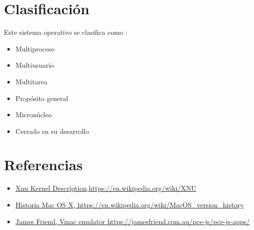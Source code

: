 \documentclass[paper=a4, fontsize=12pt]{article} 		%
\numberwithin{equation}{section}						%
\numberwithin{table}{section} 							%
\begin{document}
\section{Clasificación}
Este sistema operativo se clasifica como : 
\begin{itemize}
\item Multiproceso 
\item Multiusuario
\item Multitarea
\item Propósito general
\item Micronúcleo
\item Cerrado  en su  desarrollo
\end{itemize}
\section{Referencias}
\begin{itemize}
\item  \hyperref[https://en.wikipedia.org/wiki/XNU]{Xnu Kernel Description,https://en.wikipedia.org/wiki/XNU}
\item \hyperref[https://en.wikipedia.org/wiki/MacOS_version_history]{Historia Mac OS X, https://en.wikipedia.org/wiki/MacOS\_version\_history}
\item \hyperref[https://jamesfriend.com.au/pce-js/pce-js-apps/]{James Friend, Vmac emulator https://jamesfriend.com.au/pce-js/pce-js-apps/}
\end{itemize}
\end{document}
